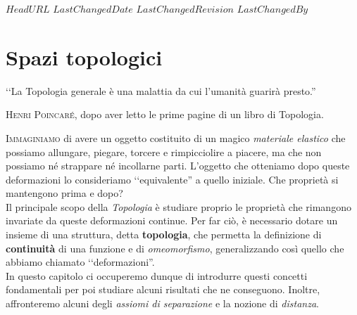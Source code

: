 \svnidlong
{$HeadURL$}
{$LastChangedDate$}
{$LastChangedRevision$}
{$LastChangedBy$}

\chapter{Spazi topologici}

\begin{introduction}
‘‘La Topologia generale è una malattia da cui l'umanità guarirà presto.''
\begin{flushright}
	\textsc{Henri Poincaré,} dopo aver letto le prime pagine di un libro di Topologia.
\end{flushright}
\end{introduction}
\lettrine[findent=1pt, nindent=0pt]{I}{mmaginiamo} di avere un oggetto costituito di un magico \emph{materiale elastico} che possiamo allungare, piegare, torcere e rimpicciolire a piacere, ma che non possiamo né strappare né incollarne parti. L'oggetto che otteniamo dopo queste deformazioni lo consideriamo ‘‘equivalente'' a quello iniziale. Che proprietà si mantengono prima e dopo?\\
Il principale scopo della \textit{Topologia} è studiare proprio le proprietà che rimangono invariate da queste deformazioni continue. Per far ciò, è necessario dotare un insieme di una struttura, detta \textbf{topologia}, che permetta la definizione di \textbf{continuità} di una funzione e di \emph{omeomorfismo}, generalizzando così quello che abbiamo chiamato ‘‘deformazioni''.\\
In questo capitolo ci occuperemo dunque di introdurre questi concetti fondamentali per poi studiare alcuni risultati che ne conseguono. Inoltre, affronteremo alcuni degli \emph{assiomi di separazione} e la nozione di \emph{distanza}.
